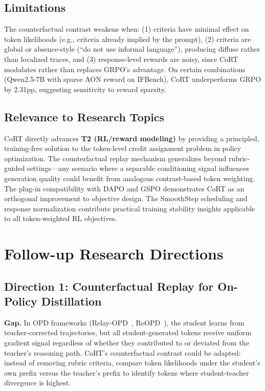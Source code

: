 \documentclass[11pt,a4paper]{article}
\begin{document}
\subsection{Limitations}
The counterfactual contrast weakens when: (1) criteria have minimal effect on token likelihoods (e.g., criteria already implied by the prompt), (2) criteria are global or absence-style (``do not use informal language''), producing diffuse rather than localized traces, and (3) response-level rewards are noisy, since CoRT modulates rather than replaces GRPO's advantage. On certain combinations (Qwen2.5-7B with sparse AON reward on IFBench), CoRT underperforms GRPO by 2.31pp, suggesting sensitivity to reward sparsity.

\subsection{Relevance to Research Topics}
CoRT directly advances \textbf{T2 (RL/reward modeling)} by providing a principled, training-free solution to the token-level credit assignment problem in policy optimization. The counterfactual replay mechanism generalizes beyond rubric-guided settings---any scenario where a separable conditioning signal influences generation quality could benefit from analogous contrast-based token weighting. The plug-in compatibility with DAPO and GSPO demonstrates CoRT as an orthogonal improvement to objective design. The SmoothStep scheduling and response normalization contribute practical training stability insights applicable to all token-weighted RL objectives.

\section{Follow-up Research Directions}

\subsection{Direction 1: Counterfactual Replay for On-Policy Distillation}

\textbf{Gap.} In OPD frameworks (Relay-OPD~\cite{relayopd2026}, ReOPD~\cite{reopd2026}), the student learns from teacher-corrected trajectories, but all student-generated tokens receive uniform gradient signal regardless of whether they contributed to or deviated from the teacher's reasoning path. CoRT's counterfactual contrast could be adapted: instead of removing rubric criteria, compare token likelihoods under the student's own prefix versus the teacher's prefix to identify tokens where student-teacher divergence is highest.
\end{document}
